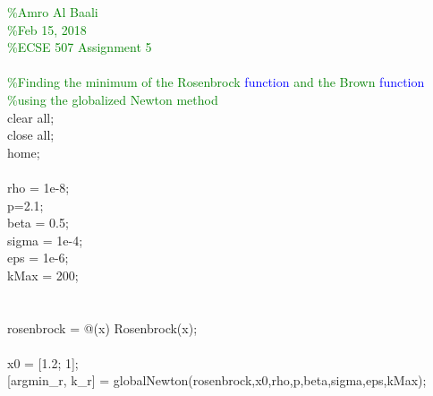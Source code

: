 \hspace{1mm}\textcolor{green}{\%Amro Al Baali }\\ 
\hspace{1mm}\textcolor{green}{\%Feb 15, 2018 }\\ 
\hspace{1mm}\textcolor{green}{\%ECSE 507 Assignment 5 }\\ 
\hspace{1mm} \\ 
\hspace{1mm}\textcolor{green}{\%Finding the minimum of the Rosenbrock \textcolor{blue}{function} and the Brown \textcolor{blue}{function} }\\ 
\hspace{1mm}\textcolor{green}{\%using the globalized Newton method }\\ 
\hspace{1mm}clear all; \\ 
\hspace{1mm}close all; \\ 
\hspace{1mm}home; \\ 
\hspace{1mm} \\ 
\hspace{1mm}rho = 1e-8; \\ 
\hspace{1mm}p=2.1; \\ 
\hspace{1mm}beta = 0.5; \\ 
\hspace{1mm}sigma = 1e-4; \\ 
\hspace{1mm}eps = 1e-6; \\ 
\hspace{1mm}kMax = 200; \\ 
\hspace{1mm} \\ 
\hspace{1mm} \\ 
\hspace{1mm}rosenbrock = @(x) Rosenbrock(x); \\ 
\hspace{1mm} \\ 
\hspace{1mm}x0 = [1.2; 1]; \\ 
\hspace{1mm}[argmin\_r, k\_r] = globalNewton(rosenbrock,x0,rho,p,beta,sigma,eps,kMax); \\ 
